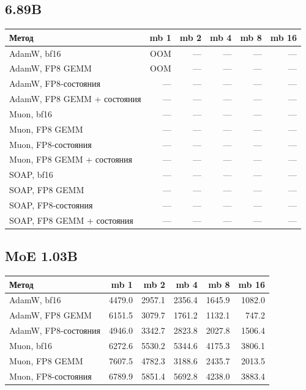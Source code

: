 \documentclass[10pt]{article}
\begin{document}
\subsection{6.89B}
\begin{center}
\small
\begin{tabular}{lrrrrr}
\toprule
\textbf{Метод} & \textbf{mb 1} & \textbf{mb 2} & \textbf{mb 4} & \textbf{mb 8} & \textbf{mb 16} \\
\midrule
AdamW, bf16 & \textcolor{oomgray}{OOM} & --- & --- & --- & --- \\
AdamW, FP8 GEMM & \textcolor{oomgray}{OOM} & --- & --- & --- & --- \\
AdamW, FP8-состояния & --- & --- & --- & --- & --- \\
AdamW, FP8 GEMM + состояния & --- & --- & --- & --- & --- \\
Muon, bf16 & --- & --- & --- & --- & --- \\
Muon, FP8 GEMM & --- & --- & --- & --- & --- \\
Muon, FP8-состояния & --- & --- & --- & --- & --- \\
Muon, FP8 GEMM + состояния & --- & --- & --- & --- & --- \\
SOAP, bf16 & --- & --- & --- & --- & --- \\
SOAP, FP8 GEMM & --- & --- & --- & --- & --- \\
SOAP, FP8-состояния & --- & --- & --- & --- & --- \\
SOAP, FP8 GEMM + состояния & --- & --- & --- & --- & --- \\
\bottomrule
\end{tabular}
\end{center}
\subsection{MoE 1.03B}
\begin{center}
\small
\begin{tabular}{lrrrrr}
\toprule
\textbf{Метод} & \textbf{mb 1} & \textbf{mb 2} & \textbf{mb 4} & \textbf{mb 8} & \textbf{mb 16} \\
\midrule
AdamW, bf16 & 4479.0 & 2957.1 & 2356.4 & 1645.9 & 1082.0 \\
AdamW, FP8 GEMM & 6151.5 & 3079.7 & 1761.2 & 1132.1 & 747.2 \\
AdamW, FP8-состояния & 4946.0 & 3342.7 & 2823.8 & 2027.8 & 1506.4 \\
Muon, bf16 & 6272.6 & 5530.2 & 5344.6 & 4175.3 & 3806.1 \\
Muon, FP8 GEMM & 7607.5 & 4782.3 & 3188.6 & 2435.7 & 2013.5 \\
Muon, FP8-состояния & 6789.9 & 5851.4 & 5692.8 & 4238.0 & 3883.4 \\
\bottomrule
\end{tabular}
\end{center}
\end{document}
